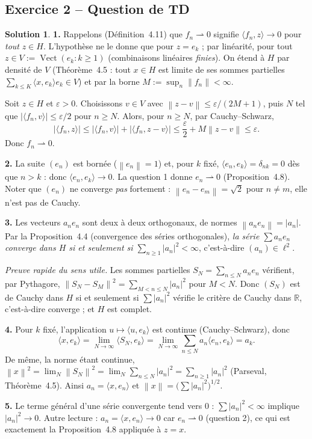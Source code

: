 \documentclass[11pt,a4paper]{article}
\newcommand{\R}{\mathbb{R}}
\newcommand{\Vect}{\operatorname{Vect}}
\newcommand{\norm}[1]{\left\|#1\right\|}
\newcommand{\ie}{c'est-à-dire}
\theoremstyle{definition}
\newtheorem*{solution}{Solution}
\begin{document}
\subsection*{Exercice 2 -- Question de TD}

\begin{solution}
\noindent\textbf{1.} Rappelons (Définition~4.11) que $f_n\rightharpoonup0$ signifie $\langle f_n,z\rangle\to0$ pour \emph{tout} $z\in H$. L'hypothèse ne le donne que pour $z=e_k$ ; par linéarité, pour tout $z\in V:=\Vect(e_k : k\ge1)$ (combinaisons linéaires \emph{finies}). On étend à $H$ par densité de $V$ (Théorème~4.5 : tout $x\in H$ est limite de ses sommes partielles $\sum_{k\le K}\langle x,e_k\rangle e_k\in V$) et par la borne $M:=\sup_n\norm{f_n}<\infty$.

Soit $z\in H$ et $\varepsilon>0$. Choisissons $v\in V$ avec $\norm{z-v}\le\varepsilon/(2M+1)$, puis $N$ tel que $|\langle f_n,v\rangle|\le\varepsilon/2$ pour $n\ge N$. Alors, pour $n\ge N$, par Cauchy--Schwarz,
\[
|\langle f_n,z\rangle|\le|\langle f_n,v\rangle|+|\langle f_n,z-v\rangle|\le\frac\varepsilon2+M\norm{z-v}\le\varepsilon .
\]
Donc $f_n\rightharpoonup0$.

\medskip
\noindent\textbf{2.} La suite $(e_n)$ est bornée ($\norm{e_n}=1$) et, pour $k$ fixé, $\langle e_n,e_k\rangle=\delta_{nk}=0$ dès que $n>k$ : donc $\langle e_n,e_k\rangle\to0$. La question 1 donne $e_n\rightharpoonup0$ (Proposition~4.8). Noter que $(e_n)$ ne converge \emph{pas} fortement : $\norm{e_n-e_m}=\sqrt2$ pour $n\ne m$, elle n'est pas de Cauchy.

\medskip
\noindent\textbf{3.} Les vecteurs $a_ne_n$ sont deux à deux orthogonaux, de normes $\norm{a_ne_n}=|a_n|$. Par la Proposition~4.4 (convergence des séries orthogonales), \emph{la série $\sum a_ne_n$ converge dans $H$ si et seulement si $\sum_{n\ge1}|a_n|^2<\infty$}, \ie{} $(a_n)\in\ell^2$.

\emph{Preuve rapide du sens utile.} Les sommes partielles $S_N=\sum_{n\le N}a_ne_n$ vérifient, par Pythagore, $\norm{S_N-S_M}^2=\sum_{M<n\le N}|a_n|^2$ pour $M<N$. Donc $(S_N)$ est de Cauchy dans $H$ si et seulement si $\sum|a_n|^2$ vérifie le critère de Cauchy dans $\R$, \ie{} converge ; et $H$ est complet.

\medskip
\noindent\textbf{4.} Pour $k$ fixé, l'application $u\mapsto\langle u,e_k\rangle$ est continue (Cauchy--Schwarz), donc
\[
\langle x,e_k\rangle=\lim_{N\to\infty}\langle S_N,e_k\rangle=\lim_{N\to\infty}\sum_{n\le N}a_n\langle e_n,e_k\rangle=a_k .
\]
De même, la norme étant continue, $\norm x^2=\lim_N\norm{S_N}^2=\lim_N\sum_{n\le N}|a_n|^2=\sum_{n\ge1}|a_n|^2$ (Parseval, Théorème~4.5). Ainsi $a_n=\langle x,e_n\rangle$ et $\norm x=\big(\sum|a_n|^2\big)^{1/2}$.

\medskip
\noindent\textbf{5.} Le terme général d'une série convergente tend vers $0$ : $\sum|a_n|^2<\infty$ implique $|a_n|^2\to0$. Autre lecture : $a_n=\langle x,e_n\rangle\to0$ car $e_n\rightharpoonup0$ (question 2), ce qui est exactement la Proposition~4.8 appliquée à $z=x$.
\end{solution}
\end{document}
